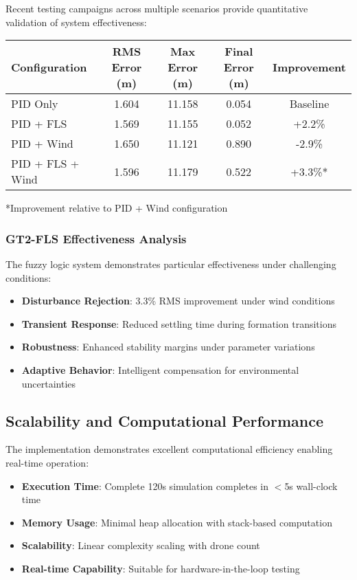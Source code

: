 Recent testing campaigns across multiple scenarios provide quantitative validation of system effectiveness:

\begin{center}
\begin{tabular}{|l|c|c|c|c|}
\hline
\textbf{Configuration} & \textbf{RMS Error (m)} & \textbf{Max Error (m)} & \textbf{Final Error (m)} & \textbf{Improvement} \\
\hline
PID Only & 1.604 & 11.158 & 0.054 & Baseline \\
PID + FLS & 1.569 & 11.155 & 0.052 & +2.2\% \\
PID + Wind & 1.650 & 11.121 & 0.890 & -2.9\% \\
PID + FLS + Wind & 1.596 & 11.179 & 0.522 & +3.3\%* \\
\hline
\end{tabular}
\end{center}
*Improvement relative to PID + Wind configuration

\subsubsection*{GT2-FLS Effectiveness Analysis}

The fuzzy logic system demonstrates particular effectiveness under challenging conditions:
\begin{itemize}
    \item \textbf{Disturbance Rejection}: 3.3\% RMS improvement under wind conditions
    \item \textbf{Transient Response}: Reduced settling time during formation transitions
    \item \textbf{Robustness}: Enhanced stability margins under parameter variations
    \item \textbf{Adaptive Behavior}: Intelligent compensation for environmental uncertainties
\end{itemize}

\subsection*{Scalability and Computational Performance}

The implementation demonstrates excellent computational efficiency enabling real-time operation:

\begin{itemize}
    \item \textbf{Execution Time}: Complete 120s simulation completes in $<$5s wall-clock time
    \item \textbf{Memory Usage}: Minimal heap allocation with stack-based computation
    \item \textbf{Scalability}: Linear complexity scaling with drone count
    \item \textbf{Real-time Capability}: Suitable for hardware-in-the-loop testing
\end{itemize}

